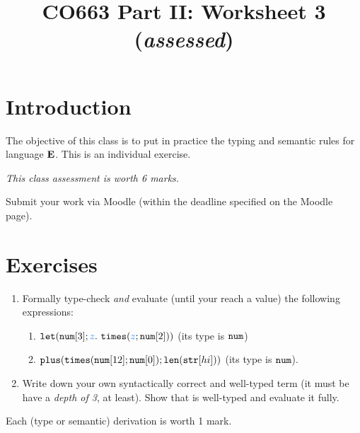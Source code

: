 \documentclass[11pt]{article}
\begin{document}
\title{CO663 Part II: Worksheet 3 (\emph{assessed})}

\date{\vspace{-5ex}}
\maketitle


\newcommand{\answerbox}[1]{\framebox{\parbox[c][#1]{\textwidth}{
      \color{white}{h}%
    }}}


\section{Introduction}

The objective of this class is to put in practice the typing and
semantic rules for language $\textbf{E}$.
% 
This is an individual exercise.

\begin{center}
  \emph{This class assessment is worth {\color{red} 6} marks.}
\end{center}

Submit your work via Moodle (within the deadline specified on the
Moodle page).


\section{Exercises}

\begin{enumerate}
\item Formally type-check \emph{and} evaluate (until your reach a value) the
following expressions:
\begin{enumerate}
\item $\elet{\enum{3}}{{z}}{\etimes{\var{z}}{\enum{2}}}$ (its type is $\enum{}$)
\item $\eplus{\etimes{\enum{12}}{\enum{0}}}{\elen{\estr{hi}}}$ (its type is $\enum{}$).
\end{enumerate}
\item Write down your own syntactically correct and well-typed term
  (it must be have a \emph{depth of 3}, at least). Show
  that is well-typed and evaluate it fully.
\end{enumerate} 

Each (type or semantic) derivation is worth 1 mark.

% 
\end{document}
